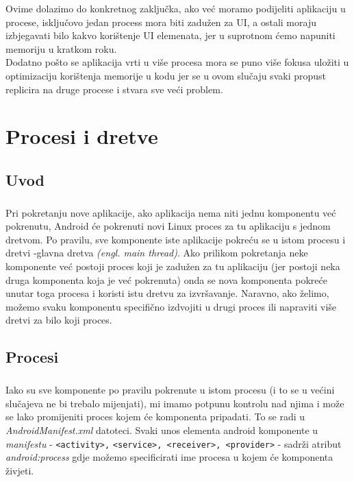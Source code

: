 \documentclass[times, utf8, zavrsni]{fer}
\begin{document}
Ovime dolazimo do konkretnog zaključka, ako već moramo podijeliti aplikaciju u procese, isključovo jedan process mora biti zadužen za UI, a ostali moraju izbjegavati bilo kakvo korištenje UI elemenata, jer u suprotnom ćemo napuniti memoriju u kratkom roku.\\

Dodatno pošto se aplikacija vrti u više procesa mora se puno više fokusa uložiti u optimizaciju korištenja memorije u kodu jer se u ovom slučaju svaki propust replicira na druge procese i stvara sve veći problem.

\pagebreak
\chapter{Procesi i dretve}
\section{Uvod}
\paragraph{}
Pri pokretanju nove aplikacije, ako aplikacija nema niti jednu komponentu već pokrenutu, Android će pokrenuti novi Linux proces za tu aplikaciju s jednom dretvom. Po pravilu, sve komponente iste aplikacije pokreću se u istom procesu i dretvi -glavna dretva \textit{(engl. main thread)}. Ako prilikom pokretanja neke komponente već postoji proces koji je zadužen za tu aplikaciju (jer postoji neka druga komponenta koja je već pokrenuta) onda se nova komponenta pokreće unutar toga procesa i koristi istu dretvu za izvršavanje. Naravno, ako želimo, možemo svaku komponentu specifično izdvojiti u drugi proces ili napraviti više dretvi za bilo koji proces.

\section{Procesi}
\paragraph{}
Iako su sve komponente po pravilu pokrenute u istom procesu (i to se u većini slučajeva ne bi trebalo mijenjati), mi imamo potpunu kontrolu nad njima i može se lako promijeniti proces kojem će komponenta pripadati. To se radi u \textit{AndroidManifest.xml} datoteci. Svaki unos elementa android komponente u \textit{manifestu} - \verb|<activity>,| \verb|<service>, <receiver>, <provider>| - sadrži atribut \textit{android:process} gdje možemo specificirati ime procesa u kojem će komponenta živjeti.
\end{document}
